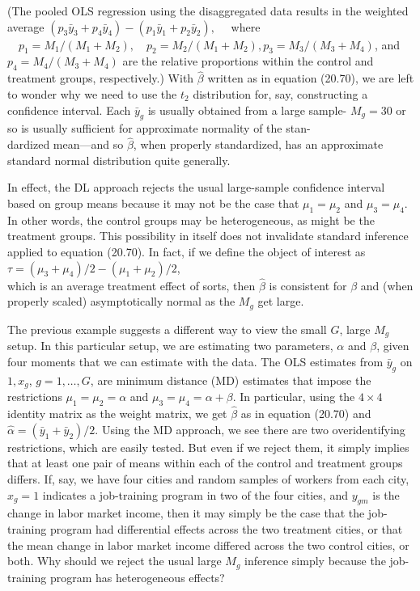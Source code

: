\documentclass[10pt]{article}
\begin{document}
(The pooled OLS regression using the disaggregated data results in the weighted average $\left(p_{3} \bar{y}_{3}+p_{4} \bar{y}_{4}\right)-\left(p_{1} \bar{y}_{1}+p_{2} \bar{y}_{2}\right), \quad$ where $\quad p_{1}=M_{1} /\left(M_{1}+M_{2}\right), \quad p_{2}=M_{2} / \left(M_{1}+M_{2}\right), p_{3}=M_{3} /\left(M_{3}+M_{4}\right)$, and $p_{4}=M_{4} /\left(M_{3}+M_{4}\right)$ are the relative proportions within the control and treatment groups, respectively.) With $\hat{\beta}$ written as in equation (20.70), we are left to wonder why we need to use the $t_{2}$ distribution for, say, constructing a confidence interval. Each $\bar{y}_{g}$ is usually obtained from a large sample- $M_{g}=30$ or so is usually sufficient for approximate normality of the stan-\\
dardized mean—and so $\hat{\beta}$, when properly standardized, has an approximate standard normal distribution quite generally.

In effect, the DL approach rejects the usual large-sample confidence interval based on group means because it may not be the case that $\mu_{1}=\mu_{2}$ and $\mu_{3}=\mu_{4}$. In other words, the control groups may be heterogeneous, as might be the treatment groups. This possibility in itself does not invalidate standard inference applied to equation (20.70). In fact, if we define the object of interest as\\
$\tau=\left(\mu_{3}+\mu_{4}\right) / 2-\left(\mu_{1}+\mu_{2}\right) / 2$,\\
which is an average treatment effect of sorts, then $\hat{\beta}$ is consistent for $\beta$ and (when properly scaled) asymptotically normal as the $M_{g}$ get large.

The previous example suggests a different way to view the small $G$, large $M_{g}$ setup. In this particular setup, we are estimating two parameters, $\alpha$ and $\beta$, given four moments that we can estimate with the data. The OLS estimates from $\bar{y}_{g}$ on $1, x_{g}$, $g=1, \ldots, G$, are minimum distance (MD) estimates that impose the restrictions $\mu_{1}=\mu_{2}=\alpha$ and $\mu_{3}=\mu_{4}=\alpha+\beta$. In particular, using the $4 \times 4$ identity matrix as the weight matrix, we get $\hat{\beta}$ as in equation (20.70) and $\hat{\alpha}=\left(\bar{y}_{1}+\bar{y}_{2}\right) / 2$. Using the MD approach, we see there are two overidentifying restrictions, which are easily tested. But even if we reject them, it simply implies that at least one pair of means within each of the control and treatment groups differs. If, say, we have four cities and random samples of workers from each city, $x_{g}=1$ indicates a job-training program in two of the four cities, and $y_{g m}$ is the change in labor market income, then it may simply be the case that the job-training program had differential effects across the two treatment cities, or that the mean change in labor market income differed across the two control cities, or both. Why should we reject the usual large $M_{g}$ inference simply because the job-training program has heterogeneous effects?
\end{document}
